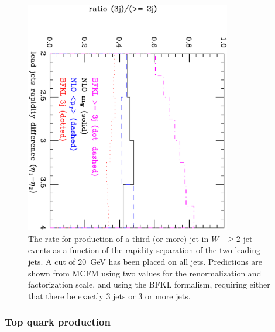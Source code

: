 \documentclass[12pt]{iopart}
\begin{document}
\begin{figure}
\begin{center}
\includegraphics[width=9cm,angle=90]{joeyrap.ps}
\end{center}
\caption{The rate for production of a third (or more) jet in $W+\ge2$ jet events as a function of the rapidity separation of the two leading jets.
A cut of $20$~GeV has been placed on all jets. Predictions are shown from MCFM using two values for the renormalization
and factorization scale, and using the BFKL formalism, requiring either that there be exactly $3$ jets or $3$ or more jets. 
\label{fig:joeyrap}}
\end{figure}
%


\subsubsection{Top quark production}
\label{sec:top_lhc}
\end{document}
